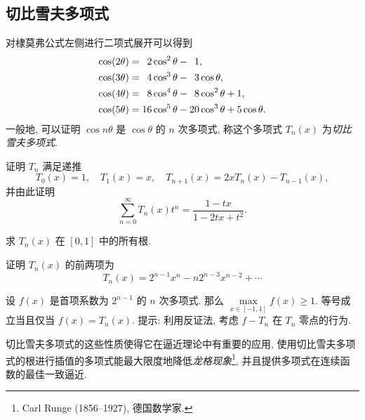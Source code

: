 \subsection{切比雪夫多项式}
对棣莫弗公式左侧进行二项式展开可以得到
\begin{align*}
  \cos(2\theta)&=\hphantom{1}2\cos^2\theta-\hphantom{1}1,\\
  \cos(3\theta)&=\hphantom{1}4\cos^3\theta-\hphantom{1}3\cos\theta,\\
  \cos(4\theta)&=\hphantom{1}8\cos^4\theta-\hphantom{1}8\cos^2\theta+1,\\
  \cos(5\theta)&=16\cos^5\theta-20\cos^3\theta+5\cos\theta.
\end{align*}
一般地, 可以证明 $\cos{n\theta}$ 是 $\cos\theta$ 的 $n$ 次多项式, 称这个多项式 $T_n(x)$ 为\emph{切比雪夫多项式}.
\begin{subex}
  \item 证明 $T_n$ 满足递推
  \[
    T_0(x)=1,\quad T_1(x)=x,\quad
    T_{n+1}(x)=2xT_n(x)-T_{n-1}(x),
  \]
  并由此证明
  \[
    \sum_{n=0}^\infty T_n(x)t^n=\frac{1-tx}{1-2tx+t^2}.
  \]
  \item 求 $T_n(x)$ 在 $[0,1]$ 中的所有根.
  \item 证明 $T_n(x)$ 的前两项为
  \[
    T_n(x)=2^{n-1}x^n-n2^{n-3}x^{n-2}+\cdots
  \]
  \item 设 $f(x)$ 是首项系数为 $2^{n-1}$ 的 $n$ 次多项式. 那么 $\max\limits_{x\in[-1,1]}f(x)\ge 1$.
  等号成立当且仅当 $f(x)=T_n(x)$. 
  提示: 利用反证法, 考虑 $f-T_n$ 在 $T_n$ 零点的行为.
\end{subex}

切比雪夫多项式的这些性质使得它在逼近理论中有重要的应用, 使用切比雪夫多项式的根进行插值的多项式能最大限度地降低\emph{龙格现象}\footnote{Carl Runge (1856--1927), 德国数学家.}, 并且提供多项式在连续函数的最佳一致逼近.
